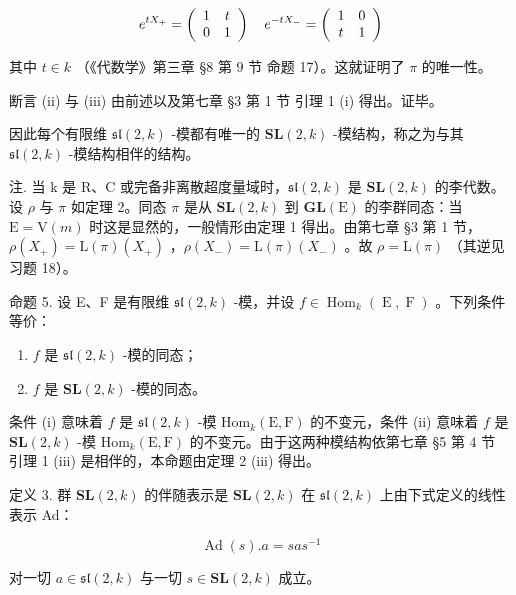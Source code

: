 \[
e ^ {t X _ {+}} = \left( \begin{array}{c c} 1 & t \\ 0 & 1 \end{array} \right) \quad e ^ {- t X _ {-}} = \left( \begin{array}{c c} 1 & 0 \\ t & 1 \end{array} \right)
\]

其中 \(t \in k\) （《代数学》第三章 §8 第 9 节 命题 17）。这就证明了 \(\pi\) 的唯一性。

断言 (ii) 与 (iii) 由前述以及第七章 §3 第 1 节 引理 1 (i) 得出。证毕。

因此每个有限维 \(\mathfrak{sl}(2,k)\) -模都有唯一的 \(\mathbf{SL}(2,k)\) -模结构，称之为与其 \(\mathfrak{sl}(2,k)\) -模结构相伴的结构。

注. 当 k 是 R、C 或完备非离散超度量域时，\(\mathfrak{sl}(2,k)\) 是 \(\mathbf{SL}(2,k)\) 的李代数。设 \(\rho\) 与 \(\pi\) 如定理 2。同态 \(\pi\) 是从 \(\mathbf{SL}(2,k)\) 到 \(\mathbf{GL}(\mathrm{E})\) 的李群同态：当 \(\mathrm{E} = \mathrm{V}(m)\) 时这是显然的，一般情形由定理 1 得出。由第七章 §3 第 1 节，\(\rho(X_{+}) = \mathrm{L}(\pi)(X_{+})\) ，\(\rho(X_{-}) = \mathrm{L}(\pi)(X_{-})\) 。故 \(\rho = \mathrm{L}(\pi)\) （其逆见习题 18）。

命题 5. 设 E、F 是有限维 \(\mathfrak{sl}(2,k)\) -模，并设 \(f \in \operatorname{Hom}_{k}(\operatorname{E},\operatorname{F})\) 。下列条件等价：

\begin{enumerate}
\def\labelenumi{(\roman{enumi})}
\item
  \(f\) 是 \(\mathfrak{sl}(2,k)\) -模的同态；
\item
  \(f\) 是 \(\mathbf{SL}(2,k)\) -模的同态。
\end{enumerate}

条件 (i) 意味着 \(f\) 是 \(\mathfrak{sl}(2,k)\) -模 \(\mathrm{Hom}_k(\mathrm{E},\mathrm{F})\) 的不变元，条件 (ii) 意味着 \(f\) 是 \(\mathbf{SL}(2,k)\) -模 \(\mathrm{Hom}_k(\mathrm{E},\mathrm{F})\) 的不变元。由于这两种模结构依第七章 §5 第 4 节 引理 1 (iii) 是相伴的，本命题由定理 2 (iii) 得出。

定义 3. 群 \(\mathbf{SL}(2,k)\) 的伴随表示是 \(\mathbf{SL}(2,k)\) 在 \(\mathfrak{sl}(2,k)\) 上由下式定义的线性表示 Ad：

\[
\operatorname{Ad} (s). a = s a s ^ {- 1}
\]

对一切 \(a \in \mathfrak{sl}(2, k)\) 与一切 \(s \in \mathbf{SL}(2, k)\) 成立。

